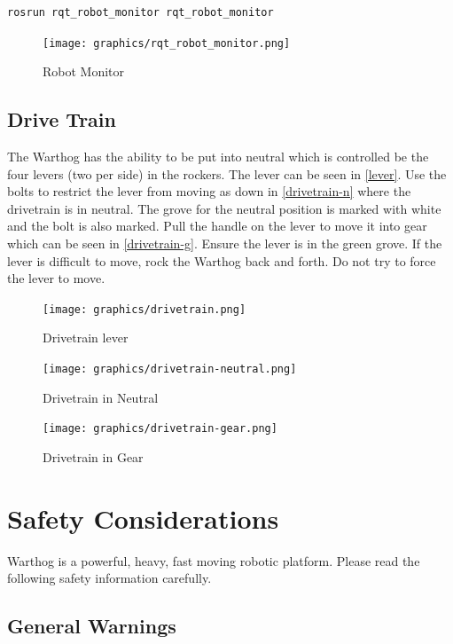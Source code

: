 \documentclass[]{clearpath-latex/clearpath-manual}
\begin{document}
\begin{lstlisting}
rosrun rqt_robot_monitor rqt_robot_monitor
\end{lstlisting}

\begin{figure}[!htb]
  \centering
  \texttt{[image: graphics/rqt\_robot\_monitor.png]}
  \caption{Robot Monitor}
  \label{robotmonitor}
\end{figure}


\subsection{Drive Train}

The Warthog has the ability to be put into neutral which is controlled be the four levers (two per side) in the rockers.  The lever can be seen in \autoref{lever}.  Use the bolts to restrict the lever from moving as down in \autoref{drivetrain-n} where the drivetrain is in neutral.  The grove for the neutral position is marked with white and the bolt is also marked.  Pull the handle on the lever to move it into gear which can be seen in \autoref{drivetrain-g}.  Ensure the lever is in the green grove.  If the lever is difficult to move, rock the Warthog back and forth.  Do not try to force the lever to move.

\begin{figure}[!htb]
  \centering
  \texttt{[image: graphics/drivetrain.png]}
  \caption{Drivetrain lever}
  \label{lever}
\end{figure}


\begin{figure}[!htb]
  \centering
  \texttt{[image: graphics/drivetrain-neutral.png]}
  \caption{Drivetrain in Neutral}
  \label{drivetrain-n}
\end{figure}


\begin{figure}[!t]
  \centering
  \texttt{[image: graphics/drivetrain-gear.png]}
  \caption{Drivetrain in Gear}
  \label{drivetrain-g}
\end{figure}


\section{Safety Considerations}

Warthog is a powerful, heavy, fast moving robotic platform. Please read the following safety information carefully.

\subsection{General Warnings}
\end{document}

